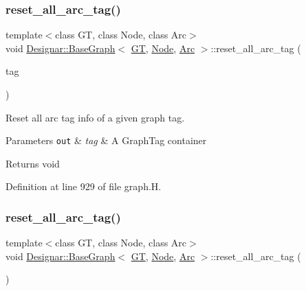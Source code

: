 \subsubsection{\texorpdfstring{reset\+\_\+all\+\_\+arc\+\_\+tag()}{reset\_all\_arc\_tag()}\hspace{0.1cm}{\footnotesize\ttfamily [1/2]}}
{\footnotesize\ttfamily template$<$class GT, class Node, class Arc$>$ \\
void \hyperlink{class_designar_1_1_base_graph}{Designar\+::\+Base\+Graph}$<$ \hyperlink{demo-buildgraph_8_c_a3001c40d2c31ca87ed96cd7d1334a55e}{GT}, \hyperlink{namespace_designar_a5af326c65aa2bd26b26c410f2030d09e}{Node}, \hyperlink{namespace_designar_a3f55fb5513d62ff47cbc8f72b8e95d6f}{Arc} $>$\+::reset\+\_\+all\+\_\+arc\+\_\+tag (\begin{DoxyParamCaption}\item[{\hyperlink{namespace_designar_ac91366256ea6ea6ac5fd483d55a7499e}{Graph\+Tag}}]{tag }\end{DoxyParamCaption})\hspace{0.3cm}{\ttfamily [inline]}}



Reset all arc tag info of a given graph tag. 


\begin{DoxyParams}[1]{Parameters}
\mbox{\tt out}  & {\em tag} & A Graph\+Tag container \\
\hline
\end{DoxyParams}
\begin{DoxyReturn}{Returns}
void 
\end{DoxyReturn}


Definition at line 929 of file graph.\+H.

\mbox{\label{class_designar_1_1_base_graph_af9ae2a4dfd676090de4b4fa04414989c}} 
\subsubsection{\texorpdfstring{reset\+\_\+all\+\_\+arc\+\_\+tag()}{reset\_all\_arc\_tag()}\hspace{0.1cm}{\footnotesize\ttfamily [2/2]}}
{\footnotesize\ttfamily template$<$class GT, class Node, class Arc$>$ \\
void \hyperlink{class_designar_1_1_base_graph}{Designar\+::\+Base\+Graph}$<$ \hyperlink{demo-buildgraph_8_c_a3001c40d2c31ca87ed96cd7d1334a55e}{GT}, \hyperlink{namespace_designar_a5af326c65aa2bd26b26c410f2030d09e}{Node}, \hyperlink{namespace_designar_a3f55fb5513d62ff47cbc8f72b8e95d6f}{Arc} $>$\+::reset\+\_\+all\+\_\+arc\+\_\+tag (\begin{DoxyParamCaption}{ }\end{DoxyParamCaption})\hspace{0.3cm}{\ttfamily [inline]}}



